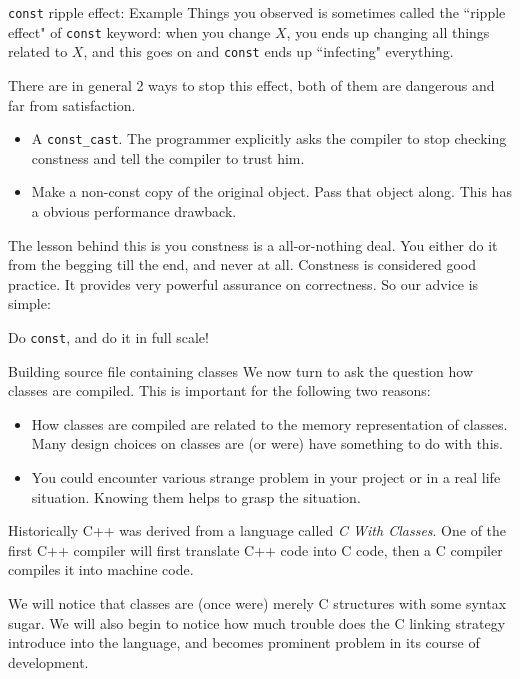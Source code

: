\begin{frame}[fragile]{\texttt{const} ripple effect: Example}
Things you observed is sometimes called the ``ripple effect" of \texttt{const} keyword: when you change $X$, you ends up changing all things related to $X$, and this goes on and \texttt{const} ends up ``infecting" everything.

There are in general 2 ways to stop this effect, both of them are dangerous and far from satisfaction.
\begin{itemize}
\item A \texttt{const\_cast}. The programmer explicitly asks the compiler to stop checking constness and tell the compiler to trust him. 
\item Make a non-const copy of the original object. Pass that object along. This has a obvious performance drawback.
\end{itemize}

The lesson behind this is you \alert{constness is a all-or-nothing deal}. You either do it from the begging till the end, and never at all. Constness is considered good practice. It provides very powerful assurance on correctness. So our advice is simple:
\begin{center}
\alert{Do \texttt{const}, and do it in full scale!}
\end{center}
\end{frame}

\begin{frame}{Building source file containing classes}
We now turn to ask the question how classes are compiled. This is important for the following two reasons:
\begin{itemize}
\item How classes are compiled are related to the memory representation of classes. Many design choices on classes are (or were) have something to do with this.
\item You could encounter various strange problem in your project or in a real life situation. Knowing them helps to grasp the situation. 
\end{itemize}
Historically C++ was derived from a language called \textit{C With Classes}. One of the first C++ compiler will first translate C++ code into C code, then a C compiler compiles it into machine code. 

\vspace{0.03in}
We will notice that classes are (once were) merely C structures with some syntax sugar. We will also begin to notice how much trouble does the C linking strategy introduce into the language, and becomes prominent problem in its course of development. 
\end{frame}

